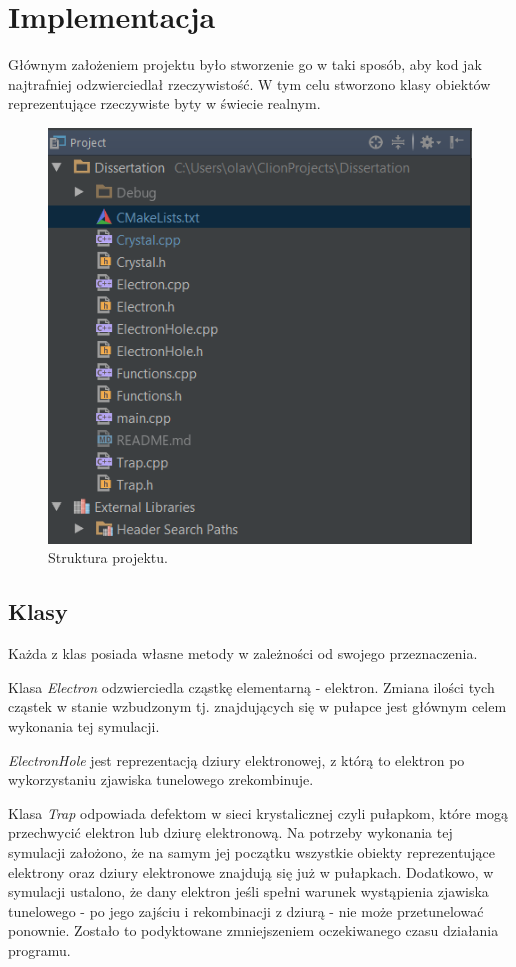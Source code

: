 \chapter{Implementacja}

Głównym założeniem projektu było stworzenie go w taki sposób, aby kod jak najtrafniej odzwierciedlał rzeczywistość. W tym celu stworzono klasy obiektów reprezentujące rzeczywiste byty w świecie realnym.
\begin{figure}[H]
\centering
\includegraphics[width=15cm]{strukturaprojektu}
\caption{Struktura projektu.}
\label{fig:Struktura projektu}
\end{figure}
\section{Klasy}
Każda z klas posiada własne metody w zależności od swojego przeznaczenia.

Klasa \textit{Electron} odzwierciedla cząstkę elementarną - elektron. Zmiana ilości tych cząstek w stanie wzbudzonym tj. znajdujących się w pułapce jest głównym celem wykonania tej symulacji.

\textit{ElectronHole} jest reprezentacją dziury elektronowej, z którą to elektron po wykorzystaniu zjawiska tunelowego zrekombinuje.

Klasa \textit{Trap} odpowiada defektom w sieci krystalicznej czyli pułapkom, które mogą przechwycić elektron lub dziurę elektronową.
Na potrzeby wykonania tej symulacji założono, że na samym jej początku wszystkie obiekty reprezentujące elektrony oraz dziury elektronowe znajdują się już w pułapkach. Dodatkowo, w symulacji ustalono, że dany elektron jeśli spełni warunek wystąpienia zjawiska tunelowego - po jego zajściu i rekombinacji z dziurą - nie może przetunelować ponownie. Zostało to podyktowane zmniejszeniem oczekiwanego czasu działania programu.

